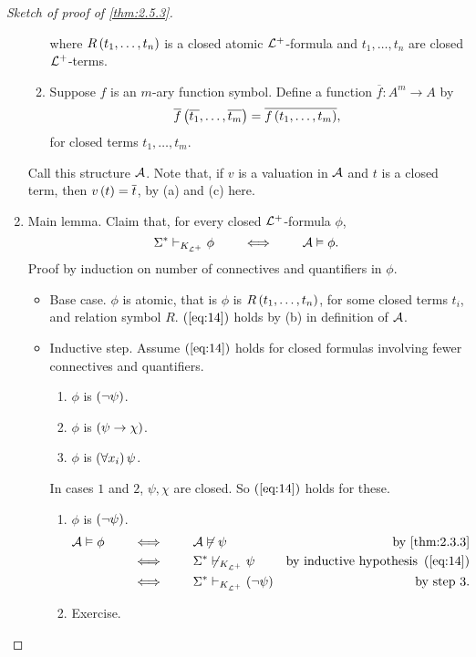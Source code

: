 \begin{proof}[Sketch of proof of \ref{thm:2.5.3}]
\begin{enumerate}[leftmargin=0.5in, label=Step \arabic*.]
\begin{enumerate}
where $ R\rb{t_1, \dots, t_n} $ is a closed atomic $ \LL^+ $-formula and $ t_1, \dots, t_n $ are closed $ \LL^+ $-terms.
\item Suppose $ f $ is an $ m $-ary function symbol. Define a function $ \overline{f} : A^m \to A $ by
$$ \overline{f}\rb{\overline{t_1}, \dots, \overline{t_m}} = \overline{f\rb{t_1, \dots, t_m}}, $$
for closed terms $ t_1, \dots, t_m $.
\end{enumerate}
Call this structure $ \AA $. Note that, if $ v $ is a valuation in $ \AA $ and $ t $ is a closed term, then $ v\rb{t} = \overline{t} $, by (a) and (c) here.
\pagebreak
\item Main lemma. Claim that, for every closed $ \LL^+ $-formula $ \phi $,
\begin{equation}
\label{eq:14}
\Sigma^* \vdash_{K_{\LL^+}} \phi \qquad \iff \qquad \AA \vDash \phi.
\end{equation}
Proof by induction on number of connectives and quantifiers in $ \phi $.
\begin{itemize}
\item Base case. $ \phi $ is atomic, that is $ \phi $ is $ R\rb{t_1, \dots, t_n} $, for some closed terms $ t_i $, and relation symbol $ R $. $ \rb{\ref{eq:14}} $ holds by (b) in definition of $ \AA $.
\item Inductive step. Assume $ \rb{\ref{eq:14}} $ holds for closed formulas involving fewer connectives and quantifiers.
\begin{enumerate}[leftmargin=0.5in, label=Case \arabic*.]
\item $ \phi $ is $ \notb{\psi} $.
\item $ \phi $ is $ \impb{\psi}{\chi} $.
\item $ \phi $ is $ \fab{x_i}\psi $.
\end{enumerate}
In cases $ 1 $ and $ 2 $, $ \psi, \chi $ are closed. So $ \rb{\ref{eq:14}} $ holds for these.
\begin{enumerate}[leftmargin=0.5in, label=Case \arabic*.]
\item $ \phi $ is $ \notb{\psi} $.
\begin{align*}
\AA \vDash \phi \qquad
& \iff \qquad \AA \not\vDash \psi & \text{by \ref{thm:2.3.3}} \\
& \iff \qquad \Sigma^* \not\vdash_{K_{\LL^+}} \psi & \text{by inductive hypothesis} \ \rb{\ref{eq:14}} \\
& \iff \qquad \Sigma^* \vdash_{K_{\LL^+}} \notb{\psi} & \text{by step} \ 3.
\end{align*}
\item Exercise.

\end{enumerate}
\end{itemize}
\end{enumerate}
\end{proof}
